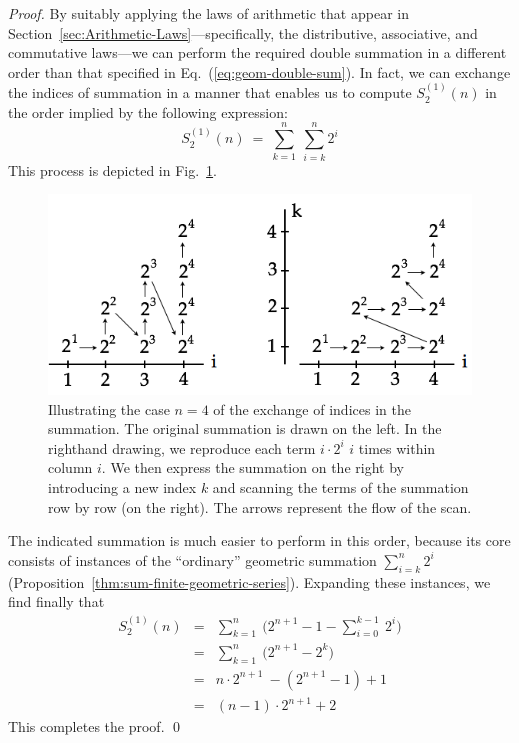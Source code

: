 \begin{proof}
By suitably applying the laws of arithmetic that appear in Section~\ref{sec:Arithmetic-Laws}---specifically, the distributive, associative, and commutative laws---we can perform the required double summation in a different order than that specified in Eq.~(\ref{eq:geom-double-sum}).  In fact, we can exchange the indices of summation in a manner that enables us to compute $S_2^{(1)}(n)$ in the order implied by the following expression:
\[
S_2^{(1)}(n) \ = \ \sum_{k=1}^{n} \ \sum_{i=k}^{n} 2^i
\]
This process is depicted in Fig.~\ref{fig:Sumi2i}.
\begin{figure}[htb]
\centerline{
\includegraphics[scale=0.35]{FiguresMaths/Sumi2i}
}
\caption{Illustrating the case $n=4$ of the exchange of indices in the summation.  The original summation is drawn on the left.  In the righthand drawing, we reproduce each term $i \cdot 2^i$ $i$ times within column $i$.  We then express the summation on the right by introducing a new index $k$ and scanning the terms of the summation row by row (on the right).  The arrows represent the flow of the scan.}
\label{fig:Sumi2i}
\end{figure}
The indicated summation is much easier to perform in this order,
because its core consists of instances of the ``ordinary'' geometric
summation $\sum_{i=k}^{n} 2^i$ (Proposition~\ref{thm:sum-finite-geometric-series}).  Expanding these instances, we find finally that
\begin{eqnarray*}
S_2^{(1)}(n)
  & = &
\sum_{k=1}^{n} \ \big( 2^{n+1} -1 - \sum_{i=0}^{k-1} \ 2^i \big) \\
  & = &
\sum_{k=1}^{n} \ \big( 2^{n+1} - 2^k \big) \\
  & = &
n \cdot 2^{n+1}\ - ( 2^{n+1} -1) +1 \\
  & = &
(n-1) \cdot 2^{n+1} +2
\end{eqnarray*}
This completes the proof.  \qed
\end{proof}

